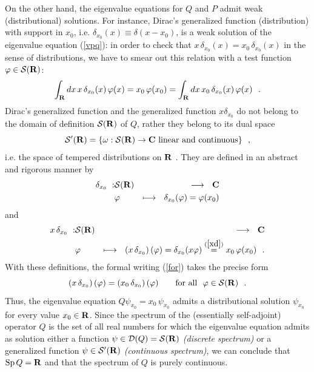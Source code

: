 \documentclass[12pt]{report}
\begin{document}
On the other hand, the eigenvalue equations for $Q$ and $P$
admit weak (distributional) solutions. 
For instance, Dirac's generalized function (distribution) 
with support in $x_0$, i.e. 
$\delta_{x_0} (x) \equiv \delta (x-x_0)$,
is a weak solution of the eigenvalue equation (\ref{vpq}):
in order to check that 
$x \, \delta _{x_0} (x) = x_0 \, \delta_{x_0} (x)$
in the sense of 
distributions, we have to smear out this relation with a test function 
$\varphi \in {\cal S}({\bf R})$:
\begin{equation}
\label{for}
\int_{{\bf R}} dx \,
x \, \delta _{x_0} (x) \, \varphi (x) = x_0 \, \varphi (x_0) =
\int_{{\bf R}} dx \,
x_0 \, \delta _{x_0} (x) \, \varphi (x)
\ \ .
\end{equation}
Dirac's generalized function and the generalized function
$x \delta _{x_0}$ do not belong to the domain of definition 
${\cal S}({\bf R})$ of $Q$, rather they belong to its dual space 
\[
{\cal S}^{\prime} ({\bf R}) = \{ \omega : {\cal S}({\bf R}) \to {\bf C} \
\mbox{linear and continuous} \}
\ \ ,
\]
i.e. the space of tempered distributions on 
${\bf R}$ \cite{rs, sg, bgc, ls, gv}.
They are defined in an abstract and rigorous manner by  
\begin{eqnarray}
\label{xd}
\delta_{x_0} \ : & {\cal S}({\bf R})  & \longrightarrow \ \ {\bf C}
\\
 & \varphi & \longmapsto \ \
\delta_{x_0} (\varphi ) = \varphi (x_0)
\nonumber
\end{eqnarray}
and
\begin{eqnarray*}
x\, \delta_{x_0} \ : & {\cal S}({\bf R})  & \longrightarrow \ \ {\bf C}
\\
 & \varphi & \longmapsto \ \
\left( x\, \delta_{x_0} \right) (\varphi ) = \delta_{x_0} (x \varphi )
\stackrel{(\ref{xd})}{=}
x_0 \, \varphi (x_0)
\ \ .
\end{eqnarray*}
With these definitions, the formal writing (\ref{for})
takes the precise form 
\[
\left(
x \, \delta _{x_0} \right) (\varphi) = \left(
x_0 \, \delta _{x_0} \right) (\varphi)
\qquad \mbox{for all} \ \ \varphi \in {\cal S}({\bf R})
\ \ .
\]
Thus, the eigenvalue equation $Q \psi_{x_0} = x_0 \, \psi_{x_0}$
admits a distributional solution $\psi_{x_0}$ for every value 
$x_0 \in {\bf R}$.
Since the spectrum of the (essentially self-adjoint) operator 
$Q$ is the set of all real numbers for which the eigenvalue equation admits
as solution either a function $\psi \in {\cal D}(Q) = {\cal S}({\bf R})$ 
{\em (discrete spectrum)} 
or a generalized function $\psi \in {\cal S}^{\prime} ({\bf R})$ 
{\em (continuous spectrum)}, 
we can conclude that ${\rm Sp} \, Q = {\bf R}$ and that 
the spectrum of $Q$ is purely continuous.
 
\end{document}
